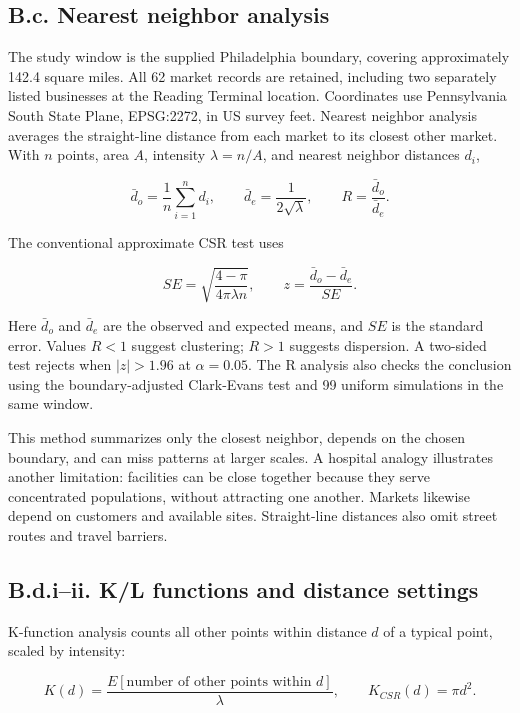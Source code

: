\documentclass[
  10pt,
]{article}
\begin{document}
\subsection{B.c. Nearest neighbor
analysis}\label{b.c.-nearest-neighbor-analysis}

The study window is the supplied Philadelphia boundary, covering
approximately 142.4 square miles. All 62 market records are retained,
including two separately listed businesses at the Reading Terminal
location. Coordinates use Pennsylvania South State Plane, EPSG:2272, in
US survey feet. Nearest neighbor analysis averages the straight-line
distance from each market to its closest other market. With \(n\)
points, area \(A\), intensity \(\lambda=n/A\), and nearest neighbor
distances \(d_i\),

\[
\bar d_o=\frac{1}{n}\sum_{i=1}^{n}d_i,\qquad
\bar d_e=\frac{1}{2\sqrt{\lambda}},\qquad
R=\frac{\bar d_o}{\bar d_e}.
\]

The conventional approximate CSR test uses

\[
SE=\sqrt{\frac{4-\pi}{4\pi\lambda n}},\qquad
z=\frac{\bar d_o-\bar d_e}{SE}.
\]

Here \(\bar d_o\) and \(\bar d_e\) are the observed and expected means,
and \(SE\) is the standard error. Values \(R<1\) suggest clustering;
\(R>1\) suggests dispersion. A two-sided test rejects when \(|z|>1.96\)
at \(\alpha=0.05\). The R analysis also checks the conclusion using the
boundary-adjusted Clark-Evans test and 99 uniform simulations in the
same window.

This method summarizes only the closest neighbor, depends on the chosen
boundary, and can miss patterns at larger scales. A hospital analogy
illustrates another limitation: facilities can be close together because
they serve concentrated populations, without attracting one another.
Markets likewise depend on customers and available sites. Straight-line
distances also omit street routes and travel barriers.

\subsection{B.d.i--ii. K/L functions and distance
settings}\label{b.d.iii.-kl-functions-and-distance-settings}

K-function analysis counts all other points within distance \(d\) of a
typical point, scaled by intensity:

\[
K(d)=\frac{E[\text{number of other points within }d]}{\lambda},
\qquad K_{CSR}(d)=\pi d^2.
\]
\end{document}
